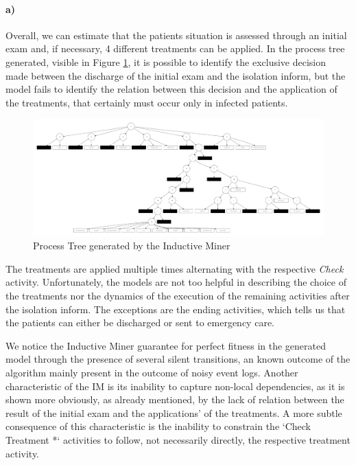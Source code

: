 \documentclass[12pt]{report}
\begin{document}
\paragraph{a)} 

Overall, we can estimate that the patients situation is assessed through an initial exam and, if necessary, 4 different treatments can be applied. In the process tree generated, visible in Figure \ref{fig:figures-q1_a_tree-pdf}, it is possible to identify the exclusive decision made between the discharge of the initial exam and the isolation inform, but the model fails to identify the relation between this decision and the application of the treatments, that certainly must occur only in infected patients.

\begin{figure}[h]
    \centering
    \includegraphics[width=\textwidth]{figures/q1_a_tree.pdf}
    \caption{Process Tree generated by the Inductive Miner}
    \label{fig:figures-q1_a_tree-pdf}
\end{figure}

The treatments are applied multiple times alternating with the respective \emph{Check} activity. Unfortunately, the models are not too helpful in describing the choice of the treatments nor the dynamics of the execution of the remaining activities after the isolation inform. The exceptions are the ending activities, which tells us that the patients can either be discharged or sent to emergency care.

We notice the Inductive Miner guarantee for perfect fitness in the generated model through the presence of several silent transitions, an known outcome of the algorithm mainly present in the outcome of noisy event logs. Another characteristic of the IM is its inability to capture non-local dependencies, as it is shown more obviously, as already mentioned, by the lack of relation between the result of the initial exam and the applications' of the treatments. A more subtle consequence of this characteristic is the inability to constrain the `Check Treatment *` activities to follow, not necessarily directly, the respective treatment activity.
\end{document}
